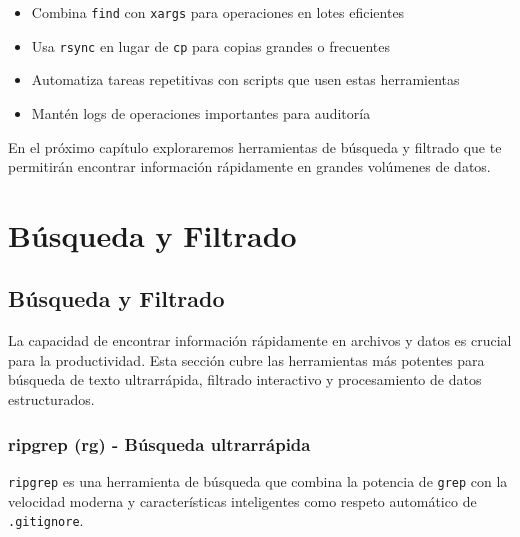 \documentclass[
  11pt,
  letterpaper,
  oneside,
  openany]{scrbook}
\providecommand{\tightlist}{%
  \setlength{\itemsep}{0pt}\setlength{\parskip}{0pt}}
\begin{document}
\begin{tcolorbox}[enhanced jigsaw, toprule=.15mm, bottomrule=.15mm, opacityback=0, coltitle=black, rightrule=.15mm, colframe=quarto-callout-tip-color-frame, titlerule=0mm, opacitybacktitle=0.6, left=2mm, colback=white, bottomtitle=1mm, arc=.35mm, leftrule=.75mm, title=\textcolor{quarto-callout-tip-color}{\faLightbulb}\hspace{0.5em}{Tips para gestión de archivos}, colbacktitle=quarto-callout-tip-color!10!white, breakable, toptitle=1mm]

\begin{itemize}
\tightlist
\item
  Combina \texttt{find} con \texttt{xargs} para operaciones en lotes
  eficientes
\item
  Usa \texttt{rsync} en lugar de \texttt{cp} para copias grandes o
  frecuentes
\item
  Automatiza tareas repetitivas con scripts que usen estas herramientas
\item
  Mantén logs de operaciones importantes para auditoría
\end{itemize}

\end{tcolorbox}

En el próximo capítulo exploraremos herramientas de búsqueda y filtrado
que te permitirán encontrar información rápidamente en grandes volúmenes
de datos.

\part{Búsqueda y Filtrado}

\chapter{Búsqueda y Filtrado}\label{buxfasqueda-y-filtrado-2}

La capacidad de encontrar información rápidamente en archivos y datos es
crucial para la productividad. Esta sección cubre las herramientas más
potentes para búsqueda de texto ultrarrápida, filtrado interactivo y
procesamiento de datos estructurados.

\section{ripgrep (rg) - Búsqueda ultrarrápida}\label{sec-ripgrep}

\texttt{ripgrep} es una herramienta de búsqueda que combina la potencia
de \texttt{grep} con la velocidad moderna y características inteligentes
como respeto automático de \texttt{.gitignore}.
\end{document}
